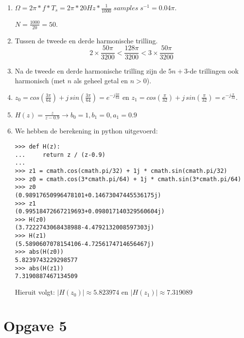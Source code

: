\documentclass[10pt,a4paper]{article}
\begin{document}
\begin{enumerate}
    \item $ \Omega = 2\pi * f * T_s = 2\pi * 20 Hz * \frac{1}{1000} \; samples
        \; s^{-1} = 0.04 \pi $.

    \noindent $ N = \frac{1000}{20} = 50 $.

    \item Tussen de tweede en derde harmonische trilling.
    \[ 2 \times \frac{50 \pi}{3200} < \frac{128 \pi}{3200} < 3 \times
    \frac{50 \pi}{3200} \]

    \item Na de tweede en derde harmonische trilling zijn de $5n+3$-de
    trillingen ook harmonisch (met $n$ als geheel getal en $n > 0$).

    \item $z_0 = cos(\frac{3\pi}{64}) + j \, sin(\frac{3\pi}{64}) =
    e^{-j\frac{3\pi}{64}}$ en $z_1 =
    cos(\frac{\pi}{32}) + j \, sin(\frac{\pi}{32}) = e^{-j\frac{\pi}{32}}$.

    \item $H(z) = \frac{z}{z-0.9} \rightarrow b_0 = 1, b_1 = 0, a_1 = 0.9$

    \item We hebben de berekening in python uitgevoerd:

    \begin{verbatim}
>>> def H(z):
...     return z / (z-0.9)
...
>>> z1 = cmath.cos(cmath.pi/32) + 1j * cmath.sin(cmath.pi/32)
>>> z0 = cmath.cos(3*cmath.pi/64) + 1j * cmath.sin(3*cmath.pi/64)
>>> z0
(0.98917650996478101+0.14673047445536175j)
>>> z1
(0.99518472667219693+0.098017140329560604j)
>>> H(z0)
(3.7222743068438988-4.4792132008597303j)
>>> H(z1)
(5.5890607078154106-4.7256174714656467j)
>>> abs(H(z0))
5.8239743229298577
>>> abs(H(z1))
7.3190887467134509
    \end{verbatim}

    Hieruit volgt: $|H(z_0)| \approx 5.823974$ en $|H(z_1)| \approx 7.319089$
\end{enumerate}


\section*{Opgave 5} %
\label{sec:Opgave 5}
\end{document}
